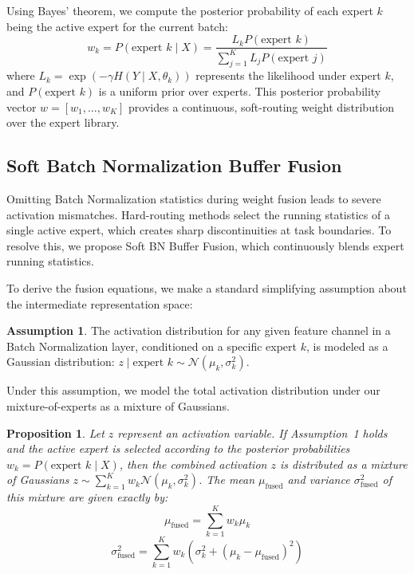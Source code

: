 \documentclass{article}
\theoremstyle{plain}
\newtheorem{proposition}[theorem]{Proposition}
\theoremstyle{definition}
\newtheorem{assumption}[theorem]{Assumption}
\theoremstyle{remark}
\begin{document}
Using Bayes' theorem, we compute the posterior probability of each expert $k$ being the active
expert for the current batch:
\begin{equation}
w_k = P(\text{expert } k \mid X) = \frac{L_k P(\text{expert } k)}{\sum_{j=1}^K L_j P(\text{expert }
j)}
\end{equation}
where $L_k = \exp(-\gamma H(Y \mid X, \theta_k))$ represents the likelihood under expert $k$, and
$P(\text{expert } k)$ is a uniform prior over experts. This posterior probability vector $w = [w_1,
\dots, w_K]$ provides a continuous, soft-routing weight distribution over the expert library.

\subsection{Soft Batch Normalization Buffer Fusion}\vspace{-0.1in}
Omitting Batch Normalization statistics during weight fusion leads to severe activation mismatches.
Hard-routing methods select the running statistics of a single active expert, which creates sharp
discontinuities at task boundaries. To resolve this, we propose Soft BN Buffer Fusion, which
continuously blends expert running statistics.

To derive the fusion equations, we make a standard simplifying assumption about the intermediate
representation space:
\begin{assumption}
The activation distribution for any given feature channel in a Batch Normalization layer,
conditioned on a specific expert $k$, is modeled as a Gaussian distribution: $z \mid \text{expert }
k \sim \mathcal{N}(\mu_k, \sigma^2_k)$.
\end{assumption}

Under this assumption, we model the total activation distribution under our mixture-of-experts as a
mixture of Gaussians.
\begin{proposition}
Let $z$ represent an activation variable. If Assumption~1 holds and the active expert is selected
according to the posterior probabilities $w_k = P(\text{expert } k \mid X)$, then the combined
activation $z$ is distributed as a mixture of Gaussians $z \sim \sum_{k=1}^K w_k \mathcal{N}(\mu_k,
\sigma^2_k)$. The mean $\mu_{\text{fused}}$ and variance $\sigma^2_{\text{fused}}$ of this mixture
are given exactly by:
\begin{equation}
    \mu_{\text{fused}} = \sum_{k=1}^K w_k \mu_k
\end{equation}
\begin{equation}
\sigma^2_{\text{fused}} = \sum_{k=1}^K w_k \left( \sigma^2_k + (\mu_k - \mu_{\text{fused}})^2
\right)
\end{equation}
\end{proposition}
\end{document}
